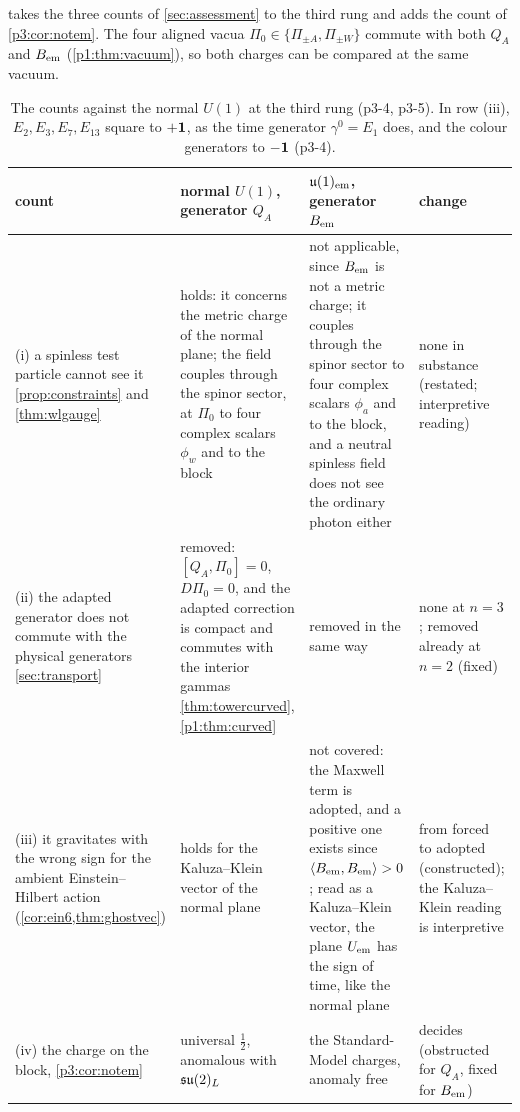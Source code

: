  takes the three counts of \cref{sec:assessment} to the third rung and adds the count of \cref{p3:cor:notem}. The four aligned vacua
$\Pi_0\in\{\Pi_{\pm A},\Pi_{\pm W}\}$ commute with both $Q_A$ and $B_{\rm em}$ (\cref{p1:thm:vacuum}), so both charges can be compared at the same vacuum.

\begin{table}[t]
\centering
\footnotesize
\begin{tabular}{@{}>{\raggedright\arraybackslash}p{3.1cm}>{\raggedright\arraybackslash}p{4.2cm}>{\raggedright\arraybackslash}p{4.4cm}>{\raggedright\arraybackslash}p{2.6cm}@{}}
\toprule
count & normal $U(1)$, generator $Q_A$ & $\mathfrak{u}(1)_{\rm em}$, generator $B_{\rm em}$ & change\\
\midrule
(i) a spinless test particle cannot see it \cref{prop:constraints} and \cref{thm:wlgauge}
& holds: it concerns the metric charge of the normal plane; the field couples through the spinor sector, at $\Pi_0$ to four complex scalars $\phi_w$ and to the block
& not applicable, since $B_{\rm em}$ is not a metric charge; it couples through the spinor sector to four complex scalars $\phi_a$ and to the block, and a neutral spinless field does not see the ordinary photon either
& none in substance (restated; interpretive reading)\\
(ii) the adapted generator does not commute with the physical generators \cref{sec:transport}
& removed: $[Q_A,\Pi_0]=0$, $D\Pi_0=0$, and the adapted correction is compact and commutes with the interior gammas \cref{thm:towercurved}, \cref{p1:thm:curved}
& removed in the same way
& none at $n=3$; removed already at $n=2$ (fixed)\\
(iii) it gravitates with the wrong sign for the ambient Einstein--Hilbert action (\cref{cor:ein6,thm:ghostvec})
& holds for the Kaluza--Klein vector of the normal plane
& not covered: the Maxwell term is adopted, and a positive one exists since $\langle B_{\rm em},B_{\rm em}\rangle>0$; read as a Kaluza--Klein vector, the plane $U_{\rm em}$ has the sign of time, like the normal plane
& from forced to adopted (constructed); the Kaluza--Klein reading is interpretive\\
(iv) the charge on the block, \cref{p3:cor:notem}
& universal $\tfrac12$, anomalous with $\mathfrak{su}(2)_L$
& the Standard-Model charges, anomaly free
& decides (obstructed for $Q_A$, fixed for $B_{\rm em}$)\\
\bottomrule
\end{tabular}
\caption{The counts against the normal $U(1)$ at the third rung (p3-4, p3-5). In row (iii), $E_2,E_3,E_7,E_{13}$ square to $+\mathbf 1$, as the time generator $\gamma^0=E_1$
does, and the colour generators to $-\mathbf 1$ (p3-4).}
\label{p3:tab:counts}
\end{table}

